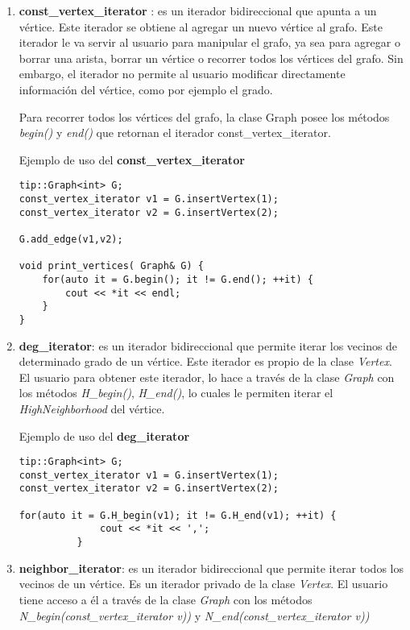 \documentclass[a4paper,12pt]{article}
\begin{document}
\begin{enumerate}
\item  \textbf{const\_vertex\_iterator} : es un iterador bidireccional que apunta a un vértice. Este iterador se obtiene al agregar un nuevo vértice al grafo. Este iterador le va servir al usuario para manipular el grafo, ya sea para agregar o borrar una arista, borrar un vértice o recorrer todos los vértices del grafo. Sin embargo, el iterador no permite al usuario modificar directamente información del vértice, como por ejemplo el grado.

Para recorrer todos los vértices del grafo, la clase Graph posee los métodos \textit{begin()} y \textit{end()} que retornan el iterador const\_vertex\_iterator.

Ejemplo de uso del \textbf{const\_vertex\_iterator}

\begin{lstlisting}[frame=single]
tip::Graph<int> G;
const_vertex_iterator v1 = G.insertVertex(1);
const_vertex_iterator v2 = G.insertVertex(2);

G.add_edge(v1,v2);

void print_vertices( Graph& G) {
    for(auto it = G.begin(); it != G.end(); ++it) {
        cout << *it << endl;
    }
}
\end{lstlisting}

\item \textbf{deg\_iterator}: es un iterador bidireccional que permite iterar los vecinos de determinado grado de un vértice. Este iterador es propio de la clase \textit{Vertex}. El usuario para obtener este iterador, lo hace a través de la clase \textit{Graph} con los métodos 
\textit{H\_begin()}, \textit{H\_end()}, lo cuales le permiten iterar el \textit{HighNeighborhood} del vértice.

Ejemplo de uso del \textbf{deg\_iterator}

\begin{lstlisting}[frame=single]
tip::Graph<int> G;
const_vertex_iterator v1 = G.insertVertex(1);
const_vertex_iterator v2 = G.insertVertex(2);

for(auto it = G.H_begin(v1); it != G.H_end(v1); ++it) {
              cout << *it << ',';
          }
\end{lstlisting}


\item \textbf{neighbor\_iterator}: es un iterador bidireccional que permite iterar todos los vecinos de un vértice. Es un iterador privado de la clase \textit{Vertex}. El usuario tiene acceso a él a través de la clase \textit{Graph} con los métodos \textit{N\_begin(const\_vertex\_iterator v))} y \textit{N\_end(const\_vertex\_iterator v))}
\end{enumerate}
\end{document}
